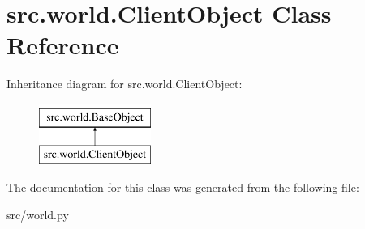 \hypertarget{classsrc_1_1world_1_1_client_object}{\section{src.\-world.\-Client\-Object \-Class \-Reference}
\label{classsrc_1_1world_1_1_client_object}
}
\-Inheritance diagram for src.\-world.\-Client\-Object\-:\begin{figure}[H]
\begin{center}
\leavevmode
\includegraphics[height=2.000000cm]{classsrc_1_1world_1_1_client_object}
\end{center}
\end{figure}


\-The documentation for this class was generated from the following file\-:\begin{DoxyCompactItemize}
\item 
src/world.\-py\end{DoxyCompactItemize}
